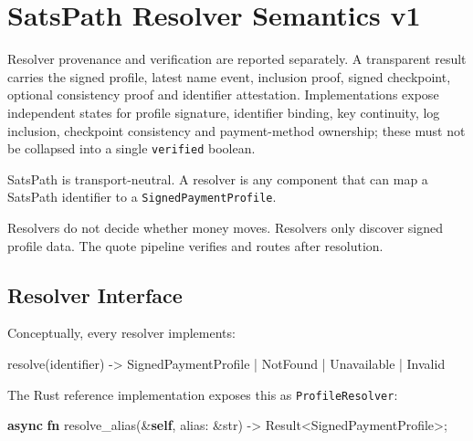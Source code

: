 \documentclass[
]{article}
\author{}
\date{}
\newenvironment{Shaded}{}{}
\newcommand{\DataTypeTok}[1]{\textcolor[rgb]{0.56,0.13,0.00}{#1}}
\newcommand{\KeywordTok}[1]{\textcolor[rgb]{0.00,0.44,0.13}{\textbf{#1}}}
\newcommand{\NormalTok}[1]{#1}
\newcommand{\OperatorTok}[1]{\textcolor[rgb]{0.40,0.40,0.40}{#1}}
\begin{document}
\hypertarget{satspath-resolver-semantics-v1}{%
\section{SatsPath Resolver Semantics
v1}\label{satspath-resolver-semantics-v1}}

Resolver provenance and verification are reported separately. A
transparent result carries the signed profile, latest name event,
inclusion proof, signed checkpoint, optional consistency proof and
identifier attestation. Implementations expose independent states for
profile signature, identifier binding, key continuity, log inclusion,
checkpoint consistency and payment-method ownership; these must not be
collapsed into a single \texttt{verified} boolean.

SatsPath is transport-neutral. A resolver is any component that can map
a SatsPath identifier to a \texttt{SignedPaymentProfile}.

Resolvers do not decide whether money moves. Resolvers only discover
signed profile data. The quote pipeline verifies and routes after
resolution.

\hypertarget{resolver-interface}{%
\subsection{Resolver Interface}\label{resolver-interface}}

Conceptually, every resolver implements:

\begin{Shaded}
\begin{Highlighting}[]
\NormalTok{resolve(identifier) {-}\textgreater{} SignedPaymentProfile | NotFound | Unavailable | Invalid}
\end{Highlighting}
\end{Shaded}

The Rust reference implementation exposes this as
\texttt{ProfileResolver}:

\begin{Shaded}
\begin{Highlighting}[]
\KeywordTok{async} \KeywordTok{fn}\NormalTok{ resolve\_alias(}\OperatorTok{\&}\KeywordTok{self}\OperatorTok{,}\NormalTok{ alias}\OperatorTok{:} \OperatorTok{\&}\DataTypeTok{str}\NormalTok{) }\OperatorTok{{-}\textgreater{}} \DataTypeTok{Result}\OperatorTok{\textless{}}\NormalTok{SignedPaymentProfile}\OperatorTok{\textgreater{};}
\end{Highlighting}
\end{Shaded}
\end{document}
